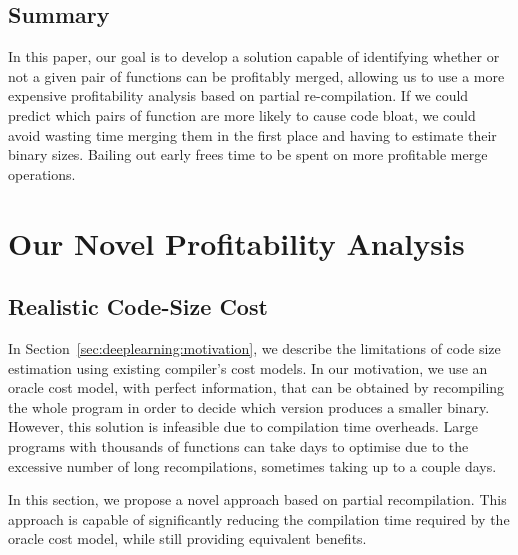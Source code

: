 

\subsection{Summary}

In this paper, our goal is to develop a solution capable of identifying whether or not a given pair of functions can be profitably merged, allowing us to use a more expensive profitability analysis based on partial re-compilation.
If we could predict which pairs of function are more likely to cause code bloat, we could avoid wasting time merging them in the first place and having to estimate their binary sizes.
Bailing out early frees time to be spent on more profitable merge operations.





\section{Our Novel Profitability Analysis}

\subsection{Realistic Code-Size Cost} \label{sec:recompilation-mechanism}

In Section~\ref{sec:deeplearning:motivation}, we describe the limitations of code size estimation using existing compiler's cost models.
In our motivation, we use an oracle cost model, with perfect information, that can be obtained by recompiling the whole program in order to decide which version produces a smaller binary.
However, this solution is infeasible due to compilation time overheads.
Large programs with thousands of functions can take days to optimise due to the excessive number of long recompilations, sometimes taking up to a couple days.

In this section, we propose a novel approach based on partial recompilation.
This approach is capable of significantly reducing the compilation time required by the oracle cost model, while still providing equivalent benefits.

